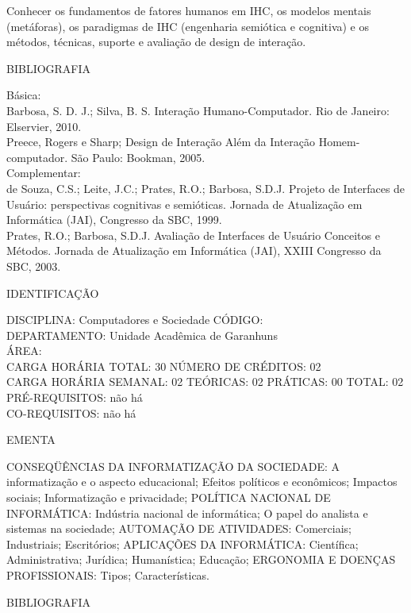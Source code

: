 \documentclass[
	12pt,				%
	openright,			%
  oneside,     %
	a4paper,			%
	english,			%
	french,				%
	spanish,			%
	brazil				%
	]{abntex2}
\begin{document}
\begin{apendicesenv}
Conhecer os fundamentos de fatores humanos em IHC, os modelos mentais
(metáforas), os paradigmas de IHC (engenharia semiótica e cognitiva) e
os métodos, técnicas, suporte e avaliação de design de interação.

BIBLIOGRAFIA 

Básica:\\
Barbosa, S. D. J.; Silva, B. S. Interação Humano-Computador. Rio de
Janeiro: Elservier, 2010.\\
Preece, Rogers e Sharp; Design de Interação  Além da Interação
Homem-computador. São Paulo: Bookman, 2005.\\
Complementar:\\
de Souza, C.S.; Leite, J.C.; Prates, R.O.; Barbosa, S.D.J. Projeto de
Interfaces de Usuário: perspectivas cognitivas e semióticas. Jornada de
Atualização em Informática (JAI), Congresso da SBC, 1999.\\
Prates, R.O.; Barbosa, S.D.J. Avaliação de Interfaces de Usuário 
Conceitos e Métodos. Jornada de Atualização em Informática (JAI), XXIII
Congresso da SBC, 2003.

\newpage IDENTIFICAÇÃO

DISCIPLINA: Computadores e Sociedade CÓDIGO:\\ 
DEPARTAMENTO: Unidade Acadêmica de Garanhuns\\
ÁREA: \\
CARGA HORÁRIA TOTAL: 30 NÚMERO DE CRÉDITOS: 02\\
CARGA HORÁRIA SEMANAL: 02 TEÓRICAS: 02 PRÁTICAS: 00 TOTAL: 02\\
PRÉ-REQUISITOS: não há\\
CO-REQUISITOS: não há

EMENTA 

CONSEQÜÊNCIAS DA INFORMATIZAÇÃO DA SOCIEDADE: A informatização e o
aspecto educacional; Efeitos políticos e econômicos; Impactos sociais;
Informatização e privacidade; POLÍTICA NACIONAL DE INFORMÁTICA:
Indústria nacional de informática; O papel do analista e sistemas na
sociedade; AUTOMAÇÃO DE ATIVIDADES: Comerciais; Industriais;
Escritórios; APLICAÇÕES DA INFORMÁTICA: Científica; Administrativa;
Jurídica; Humanística; Educação; ERGONOMIA E DOENÇAS PROFISSIONAIS:
Tipos; Características.

BIBLIOGRAFIA 


\end{apendicesenv}
\end{document}
